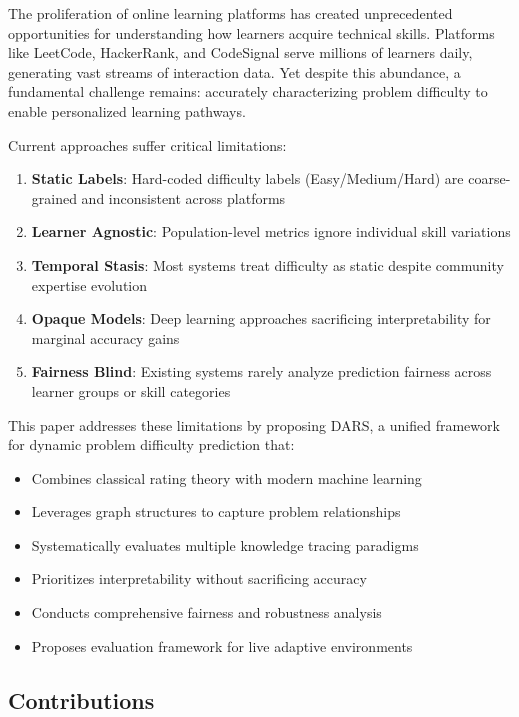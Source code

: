 \documentclass[conference]{IEEEtran}
\begin{document}
The proliferation of online learning platforms has created unprecedented opportunities for understanding how learners acquire technical skills. Platforms like LeetCode, HackerRank, and CodeSignal serve millions of learners daily, generating vast streams of interaction data. Yet despite this abundance, a fundamental challenge remains: accurately characterizing problem difficulty to enable personalized learning pathways.

Current approaches suffer critical limitations:

\begin{enumerate}
    \item \textbf{Static Labels}: Hard-coded difficulty labels (Easy/Medium/Hard) are coarse-grained and inconsistent across platforms
    \item \textbf{Learner Agnostic}: Population-level metrics ignore individual skill variations
    \item \textbf{Temporal Stasis}: Most systems treat difficulty as static despite community expertise evolution
    \item \textbf{Opaque Models}: Deep learning approaches sacrificing interpretability for marginal accuracy gains
    \item \textbf{Fairness Blind}: Existing systems rarely analyze prediction fairness across learner groups or skill categories
\end{enumerate}

This paper addresses these limitations by proposing DARS, a unified framework for dynamic problem difficulty prediction that:

\begin{itemize}
    \item Combines classical rating theory with modern machine learning
    \item Leverages graph structures to capture problem relationships
    \item Systematically evaluates multiple knowledge tracing paradigms
    \item Prioritizes interpretability without sacrificing accuracy
    \item Conducts comprehensive fairness and robustness analysis
    \item Proposes evaluation framework for live adaptive environments
\end{itemize}

\subsection{Contributions}
\end{document}
